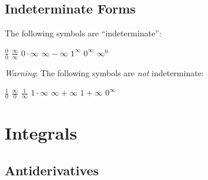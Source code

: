 \documentclass[a4paper,11pt]{article}
\theoremstyle{definition}
\theoremstyle{plain}
\theoremstyle{remark}
\begin{document}


\subsection{Indeterminate Forms}

\begin{tcolorbox}
    The following symbols are “indeterminate”:
    \begin{center}
        \begin{minipage}{10cm}
            $\frac{0}{0}$ \hspace*{\fill} $\frac{\infty}{\infty}$ \hspace*{\fill} 
            $0 \cdot \infty$ \hspace*{\fill} $\infty - \infty$ \hspace*{\fill} 
            $1^\infty$ \hspace*{\fill} $0^\infty$ \hspace*{\fill} $\infty ^ 0$
        \end{minipage}
    \end{center}
    \textit{Warning}: The following symbols are \textit{not} indeterminate:
    \begin{center}
        \begin{minipage}{10cm}
            $\frac{1}{0}$ \hspace*{\fill} $\frac{\infty}{0}$ \hspace*{\fill} 
            $\frac{1}{\infty}$ \hspace*{\fill} $1 \cdot \infty$ \hspace*{\fill} 
            $\infty + \infty$ \hspace*{\fill} $1 + \infty$ \hspace*{\fill} $0 ^ \infty$
        \end{minipage}
    \end{center}
\end{tcolorbox}




\section{Integrals}



\subsection{Antiderivatives}
\end{document}
